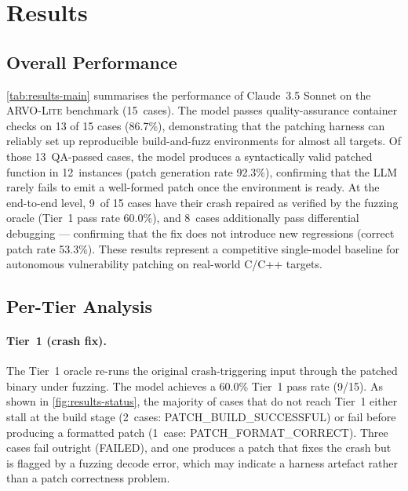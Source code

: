 
\section{Results}
\label{sec:results}

\subsection{Overall Performance}
\label{sec:results-overall}

\autoref{tab:results-main} summarises the performance of Claude~3.5 Sonnet on the
\textsc{ARVO-Lite} benchmark (15~cases).
The model passes quality-assurance container checks on 13 of 15 cases (86.7\%),
demonstrating that the patching harness can reliably set up reproducible
build-and-fuzz environments for almost all targets.
Of those 13~QA-passed cases, the model produces a syntactically valid patched function in
12~instances (patch generation rate 92.3\%), confirming that the LLM rarely
fails to emit a well-formed patch once the environment is ready.
At the end-to-end level, 9~of 15 cases have their crash repaired as verified by
the fuzzing oracle (Tier~1 pass rate 60.0\%), and 8~cases additionally pass
differential debugging — confirming that the fix does not introduce new
regressions (correct patch rate 53.3\%).
These results represent a competitive single-model baseline for autonomous
vulnerability patching on real-world C/C++ targets.

\subsection{Per-Tier Analysis}
\label{sec:results-tiers}

\paragraph{Tier~1 (crash fix).}
The Tier~1 oracle re-runs the original crash-triggering input through the patched
binary under fuzzing.
The model achieves a 60.0\% Tier~1 pass rate (9/15).
As shown in \autoref{fig:results-status}, the majority of cases that do not reach
Tier~1 either stall at the build stage (2~cases: \textsc{PATCH\_BUILD\_SUCCESSFUL})
or fail before producing a formatted patch (1~case: \textsc{PATCH\_FORMAT\_CORRECT}).
Three cases fail outright (\textsc{FAILED}), and one produces a patch that fixes
the crash but is flagged by a fuzzing decode error, which may indicate a harness
artefact rather than a patch correctness problem.

